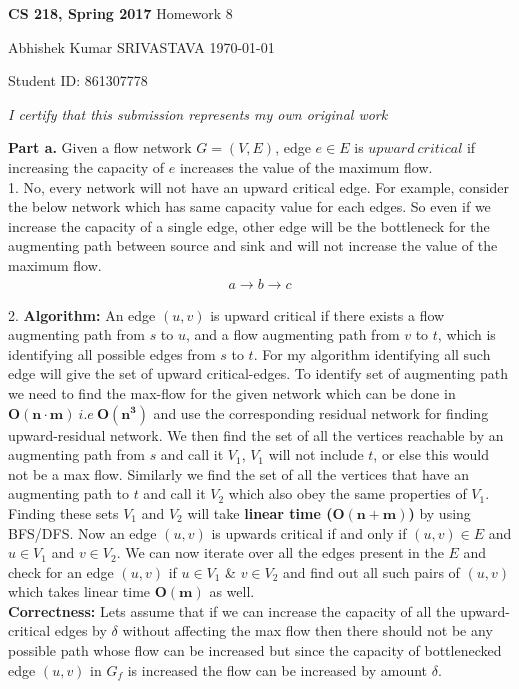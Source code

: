 \documentclass[a4paper,11pt]{article}
\renewcommand{\maketitle}{%
	
	\Large
 	\textbf{CS 218, Spring 2017}
 	\hfill
 	Homework 8
 	\par
 	
	\Large
	Abhishek Kumar SRIVASTAVA
	\hfill
	\normalsize
	\today
 	\par
 	Student ID: 861307778
 	\par
 	
 	\begin{center}

 	\vspace{.2in}
 	
 	\textit{I certify that this submission represents my own original work }
 	\par
	\vspace{.2in}
	\makebox[2.4in]{\hrulefill}
	\par

 	\end{center}
 	
 	\hrulefill
 	\par \vspace{2ex}
 	}
\theoremstyle{quest}
\newenvironment{solution}[2][Solution]{\begin{trivlist}
		\item[\hskip \labelsep {\bfseries #1}\hskip \labelsep {\bfseries #2.}]}{\end{trivlist}}
\begin{document}
\thispagestyle{empty}
	
\maketitle

\begin{solution}1 \textbf{Part a.} Given a flow network $G = (V, E)$, edge $e \in E$ is $upward~critical$ if increasing the capacity of $e$ increases the value of the maximum flow.\\
	
	1. No, every network will not have an upward critical edge. For example, consider the below network which has same capacity value for each edges. So even if we increase the capacity of a single edge, other edge will be the bottleneck for the augmenting path between source and sink and will not increase the value of the maximum flow.
	\begin{align*}
	a \rightarrow b \rightarrow c
	\end{align*}
	
	2. \textbf{Algorithm: }An edge $(u,v)$ is upward critical if there exists a flow augmenting path from $s$ to $u$, and a flow augmenting path from $v$ to $t$, which is identifying all possible edges from $s$ to $t$. For my algorithm identifying all such edge will give the set of upward critical-edges. To identify set of augmenting path we need to find the max-flow for the given network which can be done in $\mathbf{O(n\cdot m)} ~i.e~\mathbf{O(n^3)}$ and use the corresponding residual network for finding upward-residual network. We then find the set of all the vertices reachable by an augmenting path from $s$ and call it $V_1$, $V_1$ will not include $t$, or else this would not be a max flow. Similarly we find the set of all the vertices that have an augmenting path to $t$ and call it $V_2$ which also obey the same properties of $V_1$. Finding these sets $V_1$ and $V_2$ will take \textbf{linear time ($\mathbf{O(n+m)}$)} by using BFS/DFS. Now an edge $(u,v)$ is upwards critical if and only if $(u,v)\in E$ and $u \in V_1$ and $v \in V_2$. We can now iterate over all the edges present in the $E$ and check for an edge  $(u,v)$ if $u\in V_1$ \& $v\in V_2$ and find out all such pairs of $(u,v)$ which takes linear time $\mathbf{O(m)}$ as well.\\
	 
	\textbf{Correctness: }Lets assume that if we can increase the capacity of all the upward-critical edges by $\delta$ without affecting the max flow then there should not be any possible path whose flow can be increased but since the capacity of bottlenecked edge $(u,v)$ in $G_f$ is increased the flow can be increased by amount $\delta$.\\
	

\end{solution}
\end{document}

